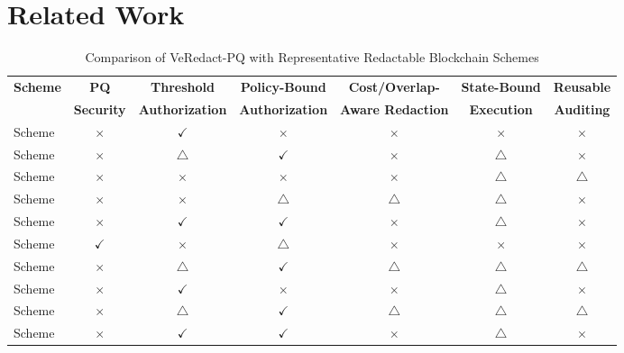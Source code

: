 \documentclass[lettersize,journal]{IEEEtran}
\begin{document}
\section{Related Work}
   \begin{table}[t]
\centering
\caption{Comparison of VeRedact-PQ with Representative Redactable
Blockchain Schemes}
\label{tab:comparison}
\renewcommand{\arraystretch}{1.15}
\setlength{\tabcolsep}{4.0pt}
\begin{tabular}{lcccccc}
\hline
\textbf{Scheme} &
\textbf{PQ} &
\textbf{Threshold} &
\textbf{Policy-Bound} &
\textbf{Cost/Overlap-} &
\textbf{State-Bound} &
\textbf{Reusable} \\
&
\textbf{Security} &
\textbf{Authorization} &
\textbf{Authorization} &
\textbf{Aware Redaction} &
\textbf{Execution} &
\textbf{Auditing} \\
\hline

Scheme~\cite{ref1}
& $\times$ & $\checkmark$ & $\times$ & $\times$
& $\times$ & $\times$ \\

Scheme~\cite{ref5}
& $\times$ & $\triangle$ & $\checkmark$ & $\times$
& $\triangle$ & $\times$ \\

Scheme~\cite{ref13}
& $\times$ & $\times$ & $\times$ & $\times$
& $\triangle$ & $\triangle$ \\

Scheme~\cite{ref14}
& $\times$ & $\times$ & $\triangle$ & $\triangle$
& $\triangle$ & $\times$ \\

Scheme~\cite{ref15}
& $\times$ & $\checkmark$ & $\checkmark$ & $\times$
& $\triangle$ & $\times$ \\

Scheme~\cite{ref17}
& $\checkmark$ & $\times$ & $\triangle$ & $\times$
& $\times$ & $\times$ \\

Scheme~\cite{ref20}
& $\times$ & $\triangle$ & $\checkmark$ & $\triangle$
& $\triangle$ & $\triangle$ \\

Scheme~\cite{ref27}
& $\times$ & $\checkmark$ & $\times$ & $\times$
& $\triangle$ & $\times$ \\

Scheme~\cite{ref33}
& $\times$ & $\triangle$ & $\checkmark$ & $\triangle$
& $\triangle$ & $\triangle$ \\

Scheme~\cite{ref34}
& $\times$ & $\checkmark$ & $\checkmark$ & $\times$
& $\triangle$ & $\times$ \\


\end{tabular}
\end{table}
\end{document}
